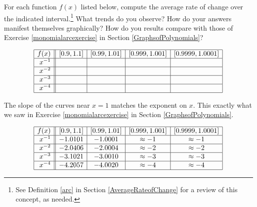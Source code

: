 \documentclass{ximera}
\begin{document}
\begin{problem}\label{laurentarcexercise}
For each function $f(x)$ listed below, compute the average rate of change over the indicated interval.\footnote{See Definition \ref{arc} in Section \ref{AverageRateofChange} for a review of this concept, as needed.}  What trends do you observe?  How do your answers manifest themselves graphically?  How do you results compare with those of Exercise \ref{monomialarcexercise} in Section \ref{GraphsofPolynomials}?

\vspace*{-0.2in}

\[ \begin{array}{|r||c|c|c|c|}  \hline

 f(x) &  [0.9, 1.1] & [0.99, 1.01] &[0.999, 1.001] & [0.9999, 1.0001]  \\ \hline
 x^{-1} &&&&   \\  \hline
 x^{-2} &&&&    \\  \hline
 x^{-3} &&&&   \\  \hline
 x^{-4} &&&&   \\  \hline
\end{array} \]

\begin{solution}
The slope of the curves near $x=1$ matches the exponent on $x$.  This exactly what we saw in  Exercise \ref{monomialarcexercise} in Section \ref{GraphsofPolynomials}.

\[ \begin{array}{|r||c|c|c|c|}  \hline

 f(x) &  [0.9, 1.1] & [0.99, 1.01] &[0.999, 1.001] & [0.9999, 1.0001]  \\ \hline
 x^{-1} & -1.0101 & -1.0001 & \approx -1 & \approx -1  \\  \hline
 x^{-2}& -2.0406& -2.0004 & \approx -2 & \approx -2   \\  \hline
 x^{-3} &-3.1021 & -3.0010 & \approx -3 & \approx -3   \\  \hline
 x^{-4} &-4.2057 & -4.0020 &\approx -4 & \approx -4   \\   \hline


\end{array} \]
\end{solution}
\end{problem}
\end{document}

